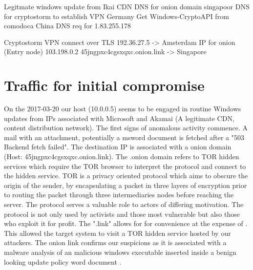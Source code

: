 \documentclass[11pt]{diazessay} %
\begin{document}
Legitmate windows update from Ikai CDN 
DNS for onion domain singapoor 
DNS for cryptostorm to establish VPN Germany
Get Windows-CryptoAPI from comodoca 
China DNS req  for 1.83.255.178 

Cryptostorm VPN connect over TLS 
192.36.27.5 -> Amsterdam IP for onion (Entry node)
103.198.0.2     45jngpxc4cgsxqxc.onion.link -> Singapore


\section{Traffic for initial compromise}

On the 2017-03-20 our host (10.0.0.5) seems to be engaged in routine Windows updates from IPs associated with Microsoft and Akamai (A legitimate CDN, content distribution network). The first signs of anomalous activity commence. A mail with an attachment, potentially a msword document is fetched after a "503 Backend fetch failed". The destination IP is associated with a onion domain (Host: 45jngpxc4cgsxqxc.onion.link). The .onion domain refers to TOR hidden services which require the TOR browser to interpret the protocol and connect to the hidden service. TOR is a privacy oriented protocol which aims to obscure the origin of the sender, by encapsulating a packet in three layers of encryption prior to routing the packet through three intermediaries nodes before reaching the server. The protocol serves a valuable role to actors of differing motivation. The protocol is not only used by activists and those most vulnerable but also those who exploit it for profit. The ".link" allows for for convenience at the expense of \cite{onionlink}. This allowed the target system to visit a TOR hidden service hosted by our attackers. The onion link confirms our suspicions as it is associated with a malware analysis of an malicious windows executable inserted inside a benign looking update policy word document \cite{hybrid}.
\end{document}
